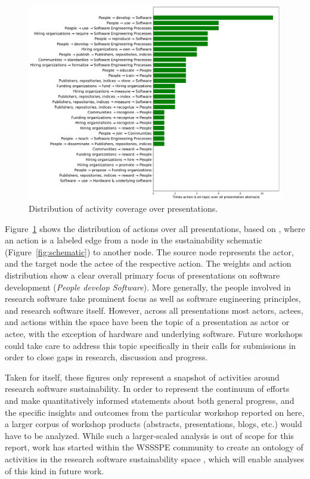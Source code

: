 \documentclass[11pt,letterpaper]{article}
\begin{document}
\begin{figure}[h!]
  \includegraphics[width=\textwidth]{sustainability-actions-plot-resize-jors.pdf}
  \caption{Distribution of activity coverage over presentations.}
  \label{fig:actions}
\end{figure}

Figure~\ref{fig:actions} shows the distribution of actions over all presentations, based on \cite{druskat_activity}, where an action is a labeled edge from a node in the sustainability schematic (Figure~\ref{fig:schematic}) to another node. The source node represents the actor, and the target node the actee of the respective action.
%
The weights and action distribution show a clear overall primary focus of presentations on software development (\textit{People develop Software}). More generally, the people involved in research software take prominent focus as well as software engineering principles, and research software itself. However, across all presentations most actors, actees, and actions within the space have been the topic of a presentation as actor or actee, with the exception of hardware and underlying software. Future workshops could take care to address this topic specifically in their calls for submissions in order to close gaps in research, discussion and progress.

Taken for itself, these figures only represent a snapshot of activities around research software sustainability. In order to represent the continuum of efforts and make quantitatively informed statements about both general progress, and the specific insights and outcomes from the particular workshop reported on here, a larger corpus of workshop products (abstracts, presentations, blogs, etc.) would have to be analyzed. While such a larger-scaled analysis is out of scope for this report, work has started within the WSSSPE community to create an ontology of activities in the research software sustainability space \cite{druskat2018mapping,druskat_mapping_nodate}, which will enable analyses of this kind in future work.
\end{document}
